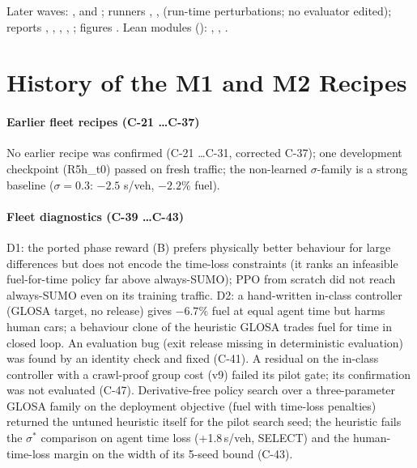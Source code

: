 {\sloppy\noindent Later waves: ,  and
; runners , ,  (run-time
perturbations; no evaluator edited); reports , , ,
, ; figures . Lean modules ():
, , .\par}


\section{History of the M1 and M2 Recipes}\label{app:history}
\paragraph{Earlier fleet recipes (C-21 \dots C-37)} No earlier recipe was confirmed (C-21 \dots C-31, corrected C-37); one development checkpoint (R5h\_t0)
passed on fresh traffic; the non-learned $\sigma$-family is a strong baseline ($\sigma=0.3$: $-2.5$ s/veh, $-2.2\%$ fuel).
\paragraph{Fleet diagnostics (C-39 \dots C-43)} D1: the ported phase reward (B) prefers physically better behaviour for large
differences but does not encode the time-loss constraints (it ranks an infeasible fuel-for-time policy far above always-SUMO); PPO from
scratch did not reach always-SUMO even on its training traffic. D2: a hand-written in-class controller (GLOSA target, no release) gives
$-6.7\%$ fuel at equal agent time but harms human cars; a behaviour clone of the heuristic GLOSA trades fuel for time in closed loop.
An evaluation bug (exit release missing in deterministic evaluation) was found by an identity check and fixed (C-41).
A residual on the in-class controller with a crawl-proof group cost (v9) failed its pilot gate; its confirmation was not evaluated (C-47).
Derivative-free policy search over a three-parameter GLOSA family on the deployment objective (fuel with time-loss penalties) returned
the untuned heuristic itself for the pilot search seed; the heuristic fails the $\sigma^*$ comparison on agent time loss (+1.8\,s/veh,
SELECT) and the human-time-loss margin on the width of its 5-seed bound (C-43).
